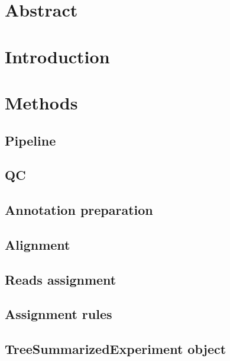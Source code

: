 \documentclass[12pt,twoside]{reedthesis}
\begin{document}
\hypertarget{abstract-3}{%
\section{Abstract}\label{abstract-3}}

\hypertarget{introduction-2}{%
\section{Introduction}\label{introduction-2}}

\hypertarget{methods-2}{%
\section{Methods}\label{methods-2}}

\hypertarget{pipeline}{%
\subsection{Pipeline}\label{pipeline}}

\hypertarget{qc}{%
\subsection{QC}\label{qc}}

\hypertarget{annotation-preparation}{%
\subsection{Annotation preparation}\label{annotation-preparation}}

\hypertarget{alignment}{%
\subsection{Alignment}\label{alignment}}

\hypertarget{reads-assignment}{%
\subsection{Reads assignment}\label{reads-assignment}}

\hypertarget{assignment-rules}{%
\subsection{Assignment rules}\label{assignment-rules}}

\hypertarget{treesummarizedexperiment-object}{%
\subsection{TreeSummarizedExperiment object}\label{treesummarizedexperiment-object}}
\end{document}
